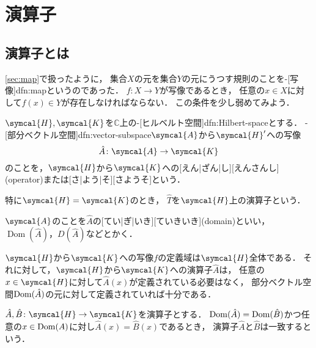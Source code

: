 \documentclass[../sotsu.tex]{subfiles}
\begin{document}
\section{演算子}
\label{sec:operator}

\subsection{演算子とは}
\label{sec:operator-intro}

\cref{sec:map}で扱ったように，
集合$X$の元を集合$Y$の元にうつす規則のことを-[写像]{dfn:map}というのであった．
$f \colon X \to Y$が写像であるとき，
任意の$x \in X$に対して$f(x) \in Y$が存在しなければならない．
この条件を少し弱めてみよう．

\begin{definition}[演算子]
    $\symcal{H}, \symcal{K}$を$ℂ$上の-[ヒルベルト空間]{dfn:Hilbert-space}とする．
    -[部分ベクトル空間]{dfn:vector-subspace}$\symcal{A}$から$\symcal{H}'$への写像
    \begin{equation*}
        \hat{A} \colon \symcal{A} \to \symcal{K}
    \end{equation*}
    のことを，$\symcal{H}$から$\symcal{K}$への[えん|ざん|し][えんさんし](operator)または[さ|よう|そ][さようそ]という．

    特に$\symcal{H} = \symcal{K}$のとき，
    $\hat{T}$を$\symcal{H}$上の演算子という．
\end{definition}

\begin{definition}[演算子の定義域]
    $\symcal{A}$のことを$\hat{A}$の[てい|ぎ|いき][ていきいき](domain)といい，$\operatorname{Dom}(\hat{A})$，$D(\hat{A})$などとかく．
\end{definition}

$\symcal{H}$から$\symcal{K}$への写像$f$の定義域は$\symcal{H}$全体である．
それに対して，$\symcal{H}$から$\symcal{K}$への演算子$\hat{A}$は，
任意の$x \in \symcal{H}$に対して$\hat{A}(x)$が定義されている必要はなく，
部分ベクトル空間$\operatorname{Dom}(\hat{A})$の元に対して定義されていれば十分である．


\begin{definition}[演算子の一致]
    $\hat{A}, \hat{B} \colon \symcal{H} \to \symcal{K}$を演算子とする．
    $\operatorname{Dom}(\hat{A}) = \operatorname{Dom}(\hat{B})$かつ任意の$x \in \operatorname{Dom}(A)$に対し$\hat{A}(x) = \hat{B}(x)$であるとき，
    演算子$\hat{A}$と$\hat{B}$は一致するという．
\end{definition}
\end{document}
